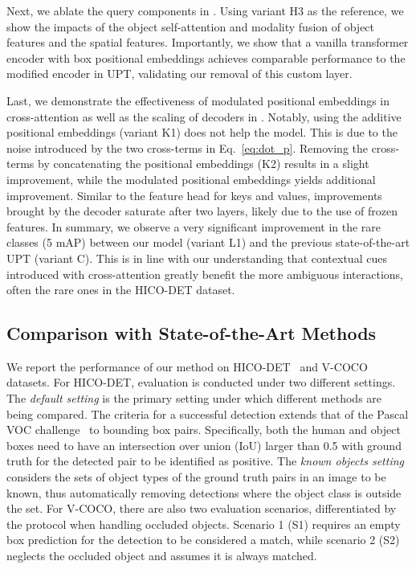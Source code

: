\documentclass[10pt,twocolumn,letterpaper]{article}
\begin{document}
Next, we ablate the query components in . Using variant H3 as the reference, we show the impacts of the object self-attention and modality fusion of object features and the spatial features. Importantly, we show that a vanilla transformer encoder with box positional embeddings achieves comparable performance to the modified encoder in UPT, validating our removal of this custom layer.

Last, we demonstrate the effectiveness of modulated positional embeddings in cross-attention as well as the scaling of decoders in . Notably, using the additive positional embeddings (variant K1) does not help the model. This is due to the noise introduced by the two cross-terms in Eq.~\ref{eq:dot_p}. Removing the cross-terms by concatenating the positional embeddings (K2) results in a slight improvement, while the modulated positional embeddings yields additional improvement. Similar to the feature head for keys and values, improvements brought by the decoder saturate after two layers, likely due to the use of frozen features. In summary, we observe a very significant improvement in the rare classes (5 mAP) between our model (variant L1) and the previous state-of-the-art UPT (variant C). This is in line with our understanding that contextual cues introduced with cross-attention greatly benefit the more ambiguous interactions, often the rare ones in the HICO-DET dataset.

\subsection{Comparison with State-of-the-Art Methods}

 We report the performance of our method on HICO-DET~\cite{hicodet} and V-COCO~\cite{vcoco} datasets. For HICO-DET, evaluation is conducted under two different settings. The \textit{default setting} is the primary setting under which different methods are being compared. The criteria for a successful detection extends that of the Pascal VOC challenge~\cite{voc} to bounding box pairs. Specifically, both the human and object boxes need to have an intersection over union (IoU) larger than 0.5 with ground truth for the detected pair to be identified as positive. The \textit{known objects setting} considers the sets of object types of the ground truth pairs in an image to be known, thus automatically removing detections where the object class is outside the set. For V-COCO, there are also two evaluation scenarios, differentiated by the protocol when handling occluded objects. Scenario 1 (S1) requires an empty box prediction for the detection to be considered a match, while scenario 2 (S2) neglects the occluded object and assumes it is always matched.
\end{document}
